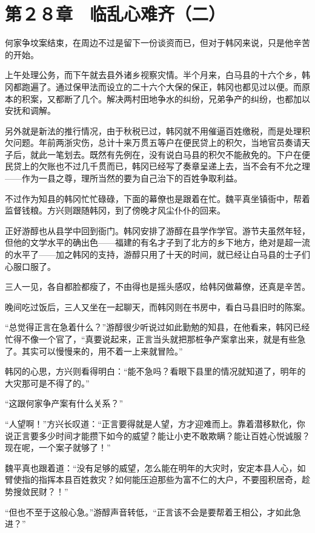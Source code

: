 \section{第２８章　临乱心难齐（二）}

何家争坟案结束，在周边不过是留下一份谈资而已，但对于韩冈来说，只是他辛苦的开始。

上午处理公务，而下午就去县外诸乡视察灾情。半个月来，白马县的十六个乡，韩冈都跑遍了。通过保甲法而设立的二十六个大保的保正，韩冈也都见过以便。而原本的积案，又都断了几个。解决两村田地争水的纠纷，兄弟争产的纠纷，也都加以安抚和调解。

另外就是新法的推行情况，由于秋税已过，韩冈就不用催逼百姓缴税，而是处理积欠问题。年前两浙灾伤，总计十来万贯五等户在便民贷上的积欠，当地官员奏请天子后，就此一笔划去。既然有先例在，没有说白马县的积欠不能赦免的。下户在便民贷上的欠账也不过几千贯而已，韩冈已经写了奏章呈递上去，当不会有不允之理——作为一县之尊，理所当然的要为自己治下的百姓争取利益。

不过作为知县的韩冈忙忙碌碌，下面的幕僚也是跟着在忙。魏平真坐镇衙中，帮着监督钱粮。方兴则跟随韩冈，到了傍晚才风尘仆仆的回来。

正好游醇也从县学中回到衙门。韩冈安排了游醇在县学作学官。游节夫虽然年轻，但他的文学水平的确出色——福建的有名才子到了北方的乡下地方，绝对是超一流的水平了——加之韩冈的支持，游醇只用了十天的时间，就已经让白马县的士子们心服口服了。

三人一见，各自都脸都瘦了，不由得也是摇头感叹，给韩冈做幕僚，还真是辛苦。

晚间吃过饭后，三人又坐在一起聊天，而韩冈则在书房中，看白马县旧时的陈案。

“总觉得正言在急着什么？”游醇很少听说过如此勤勉的知县，在他看来，韩冈已经忙得不像一个官了，“真要说起来，正言当头就把那桩争产案拿出来，就是有些急了。其实可以慢慢来的，用不着一上来就冒险。”

韩冈的心思，方兴则看得明白：“能不急吗？看眼下县里的情况就知道了，明年的大灾那可是不得了的。”

“这跟何家争产案有什么关系？”

“人望啊！”方兴长叹道：“正言要得就是人望，方才迎难而上。靠着潜移默化，你说正言要多少时间才能攒下如今的威望？能让小吏不敢欺瞒？能让百姓心悦诚服？现在呢，一个案子就够了！”

魏平真也跟着道：“没有足够的威望，怎么能在明年的大灾时，安定本县人心，如臂使指的指挥本县百姓救灾？如何能压迫那些为富不仁的大户，不要囤积居奇，趁势搜敛民财？！”

“但也不至于这般心急。”游醇声音转低，“正言该不会是要帮着王相公，才如此急进？”


